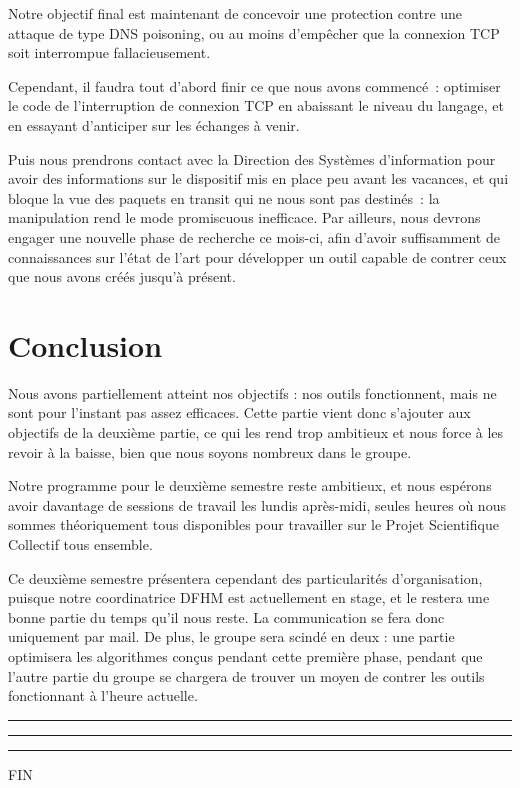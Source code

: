 \documentclass[a4paper, 12pt,twoside]{article}
\begin{document}
    Notre objectif final est maintenant de concevoir une protection contre une attaque de type DNS poisoning, ou au moins d'empêcher que la connexion TCP soit interrompue fallacieusement.

    Cependant, il faudra tout d'abord finir ce que nous avons commencé~: optimiser le code de l'interruption de connexion TCP en abaissant le niveau du langage, et en essayant d'anticiper sur les échanges à venir.

    Puis nous prendrons contact avec la Direction des Systèmes d'information pour avoir des informations sur le dispositif mis en place peu avant les vacances, et qui bloque la vue des paquets en transit qui ne nous sont pas destinés~: la manipulation rend le mode promiscuous inefficace. Par ailleurs, nous devrons engager une nouvelle phase de recherche ce mois-ci, afin d'avoir suffisamment de connaissances sur l'état de l'art pour développer un outil capable de contrer ceux que nous avons créés jusqu'à présent.

\newpage
{}
\section*{Conclusion}
	Nous avons partiellement atteint nos objectifs : nos outils fonctionnent, mais ne sont pour l'instant pas assez efficaces. Cette partie vient donc s'ajouter aux objectifs de la deuxième partie, ce qui les rend trop ambitieux et nous force à les revoir à la baisse, bien que nous soyons nombreux dans le groupe.
	
	Notre programme pour le deuxième semestre reste ambitieux, et nous espérons avoir davantage de sessions de travail les lundis après-midi, seules heures où nous sommes théoriquement tous disponibles pour travailler sur le Projet Scientifique Collectif tous ensemble.
	
	Ce deuxième semestre présentera cependant des particularités d'organisation, puisque notre coordinatrice DFHM est actuellement en stage, et le restera une bonne partie du temps qu'il nous reste. La communication se fera donc uniquement par mail. De plus, le groupe sera scindé en deux : une partie optimisera les algorithmes conçus pendant cette première phase, pendant que l'autre partie du groupe se chargera de trouver un moyen de contrer les outils fonctionnant à l'heure actuelle.
	
\begin{center}
\color{bleu303}

\rule{0.3\textwidth}{0.2mm}\vspace*{-3.5mm}

\rule{0.5\textwidth}{0.6mm}\vspace*{-3.8mm}

\rule{0.3\textwidth}{0.2mm}\vspace*{-1mm}

\sffamily FIN
\end{center}
\end{document}
